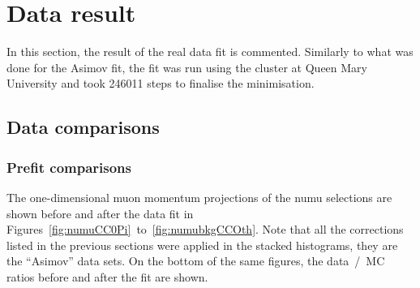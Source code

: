 \clearpage

\section{Data result}
\label{sec:data}
In this section, the result of the real data fit is commented.
Similarly to what was done for the \Gls{Asimov} fit, the fit was run
using the cluster at Queen Mary University and took 246011 steps to
finalise the minimisation.


\subsection{Data comparisons}
\label{subsec:prefitpostfitdistrib}

\subsubsection{Prefit comparisons}
The one-dimensional muon momentum projections of the \Gls{numu}
selections are shown before and after the data fit in
Figures~\ref{fig:numuCC0Pi}~to~\ref{fig:numubkgCCOth}. Note that all
the corrections listed in the previous sections were applied in the
stacked histograms, they are the ``\Gls{Asimov}'' data sets. On the
bottom of the same figures, the data~/~\Gls{MC} ratios before and
after the fit are shown.


